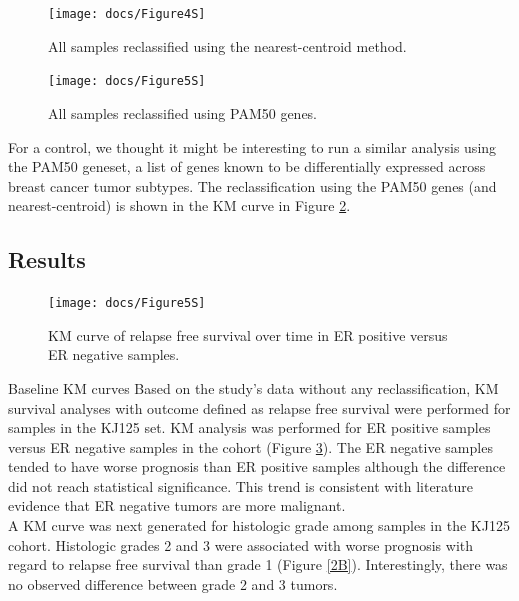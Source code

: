 \documentclass[a4paper,10pt]{article}
\begin{document}
\begin{figure}[t]
\centering
\texttt{[image: docs/Figure4S]}
\caption{All samples reclassified using the nearest-centroid method.}\label{4S}
\end{figure}
 \begin{figure}
\centering
\texttt{[image: docs/Figure5S]}
\caption{All samples reclassified using PAM50 genes.}\label{5S}
\vspace{-50pt}
\end{figure}
For a control, we thought it might be interesting to run a similar 
analysis using the PAM50 geneset, a list of genes known to be differentially
 expressed across breast cancer tumor subtypes. The reclassification using 
the PAM50 genes (and nearest-centroid) is shown in the KM curve in Figure \ref{5S}.


\subsection{Results}
 \begin{figure}
\centering
\vspace{-30pt}
\texttt{[image: docs/Figure5S]}
\caption{ KM curve of relapse free survival over time in ER positive versus ER negative samples.}\label{1B}
\vspace{-10pt}
\end{figure}
Baseline KM curves Based on the study’s data without any reclassification, KM survival analyses with outcome 
defined as relapse free survival were performed for samples in the KJ125 set.   KM analysis 
was performed for ER positive samples versus ER negative samples in the cohort (Figure \ref{1B}). 
The ER negative samples tended to have worse prognosis than ER positive samples although 
the difference did not reach statistical significance. This trend is consistent with literature 
evidence that ER negative tumors are more malignant.  \\

A KM curve was next generated for histologic grade among samples in the KJ125 cohort.  
Histologic grades 2 and 3 were associated with worse prognosis with regard to relapse 
free survival than grade 1 (Figure \ref{2B}).  Interestingly, there was no observed difference 
between grade 2 and 3 tumors.  \\
\end{document}
